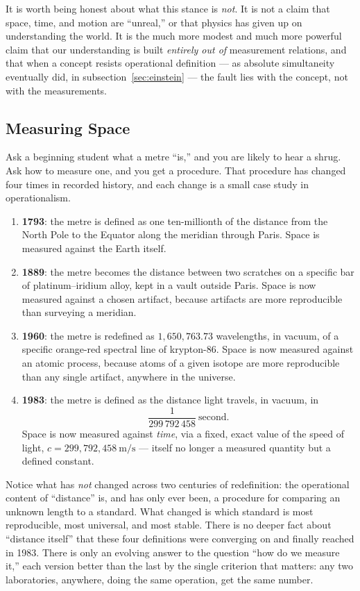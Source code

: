 It is worth being honest about what this stance is \emph{not}. It is not a claim that space, time, and motion are ``unreal,'' or that physics has given up on understanding the world. It is the much more modest and much more powerful claim that our understanding is built \emph{entirely out of} measurement relations, and that when a concept resists operational definition --- as absolute simultaneity eventually did, in subsection~\ref{sec:einstein} --- the fault lies with the concept, not with the measurements.

\subsection{Measuring Space}
\label{sec:space}

Ask a beginning student what a metre ``is,'' and you are likely to hear a shrug. Ask how to measure one, and you get a procedure. That procedure has changed four times in recorded history, and each change is a small case study in operationalism.

\begin{enumerate}[label=(\roman*)]
  \item \textbf{1793}: the metre is defined as one ten-millionth of the distance from the North Pole to the Equator along the meridian through Paris. Space is measured against the Earth itself.
  \item \textbf{1889}: the metre becomes the distance between two scratches on a specific bar of platinum--iridium alloy, kept in a vault outside Paris. Space is now measured against a chosen artifact, because artifacts are more reproducible than surveying a meridian.
  \item \textbf{1960}: the metre is redefined as \(1{,}650{,}763.73\) wavelengths, in vacuum, of a specific orange-red spectral line of krypton-86. Space is now measured against an atomic process, because atoms of a given isotope are more reproducible than any single artifact, anywhere in the universe.
  \item \textbf{1983}: the metre is defined as the distance light travels, in vacuum, in
  \[
    \frac{1}{299\,792\,458}\ \text{second}.
  \]
  Space is now measured against \emph{time}, via a fixed, exact value of the speed of light, \(c = 299{,}792{,}458\ \text{m/s}\) --- itself no longer a measured quantity but a defined constant.
\end{enumerate}

Notice what has \emph{not} changed across two centuries of redefinition: the operational content of ``distance'' is, and has only ever been, a procedure for comparing an unknown length to a standard. What changed is which standard is most reproducible, most universal, and most stable. There is no deeper fact about ``distance itself'' that these four definitions were converging on and finally reached in 1983. There is only an evolving answer to the question ``how do we measure it,'' each version better than the last by the single criterion that matters: any two laboratories, anywhere, doing the same operation, get the same number.


